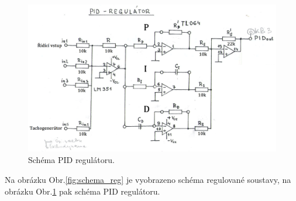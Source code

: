 \begin{figure}[!hbt] %
	\centering
	\includegraphics[]{img/schema_PID_regulatoru.png} %
	\caption{Schéma PID regulátoru.} %
	\label{fig:schema_PID} %
\end{figure}		
		
Na obrázku Obr.\ref{fig:schema_reg} je vyobrazeno schéma regulované soustavy, na obrázku Obr.\ref{fig:schema_PID} pak schéma PID regulátoru.


			

